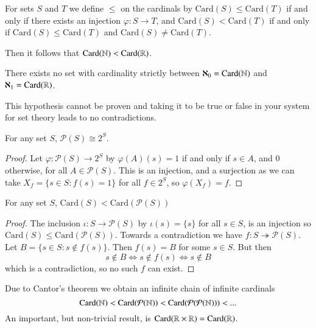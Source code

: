 \begin{definition}
    For sets $S$ and $T$ we define $\leq$ on the cardinals by $\text{Card}(S)\leq \text{Card}(T)$ if and only if there exists an injection $\varphi:S\rightarrow T$, and $\text{Card}(S) < \text{Card}(T)$ if and only if $\text{Card}(S) \leq \text{Card}(T)$ and $\text{Card}(S) \neq \text{Card}(T)$.
\end{definition}

Then it follows that $\text{Card}(\mathbb N) < \text{Card}(\mathbb R)$. 

\begin{conjecture}
    There exists no set with cardinality strictly between $\aleph_0 = \text{Card}(\mathbb N)$ and $\aleph_1 = \text{Card}(\mathbb R)$.
\end{conjecture}

This hypothesis cannot be proven and taking it to be true or false in your system for set theory leads to no contradictions.

\begin{proposition}
    For any set $S$, $\mathcal{P}(S) \cong 2^S$.
\end{proposition}
\begin{proof}
    Let $\varphi:\mathcal{P}(S)\rightarrow 2^S$ by $\varphi(A)(s) = 1$ if and only if $s \in A$, and $0$ otherwise, for all $A \in \mathcal{P}(S)$. This is an injection, and a surjection as we can take $X_f = \{s \in S: f(s) = 1\}$ for all $f \in 2^S$, so $\varphi(X_f) = f$.
\end{proof}

\begin{proposition}
    For any set $S$, $\text{Card}(S) < \text{Card}(\mathcal{P}(S))$
\end{proposition}
\begin{proof}
    The inclusion $\iota:S\rightarrow \mathcal{P}(S)$ by $\iota(s) = \{s\}$ for all $s \in S$, is an injection so $\text{Card}(S) \leq \text{Card}(\mathcal{P}(S))$. Towards a contradiction we have $f:S\twoheadrightarrow \mathcal{P}(S)$. Let $B = \{s \in S:s \notin f(s)\}$. Then $f(s) = B$ for some $s \in S$. But then $$s \notin B \iff s \notin f(s) \iff s \notin B$$ which is a contradiction, so no such $f$ can exist.
\end{proof}

Due to Cantor's theorem we obtain an infinite chain of infinite cardinals $$\text{Card}(\mathbb N) < \text{Card}(\mathcal{P}(\mathbb N)) < \text{Card}(\mathcal{P}(\mathcal{P}(\mathbb N))) < ...$$
An important, but non-trivial result, is $\text{Card}(\mathbb R\times \mathbb R) = \text{Card}(\mathbb R)$.


